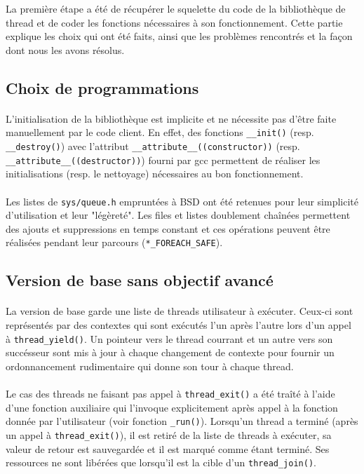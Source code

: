 La première étape a été de récupérer le squelette du code de la bibliothèque de thread et de coder les fonctions nécessaires à son fonctionnement. Cette partie explique les choix qui ont été faits, ainsi que les problèmes rencontrés et la façon dont nous les avons résolus.

\subsection{Choix de programmations}

\paragraph{} L'initialisation de la bibliothèque est implicite et ne nécessite
pas d'être faite manuellement par le code client. En effet, des fonctions
\verb!__init()!  (resp. \verb!__destroy()!) avec l'attribut
\verb!__attribute__((constructor))!  (resp.
\verb!__attribute__((destructor))!) fourni par gcc permettent de réaliser les
initialisations (resp. le nettoyage) nécessaires au bon fonctionnement.

\paragraph{} Les listes de \verb!sys/queue.h! empruntées à BSD ont été
retenues pour leur simplicité d'utilisation et leur "légèreté". Les files et
listes doublement chaînées permettent des ajouts et suppressions en temps
constant et ces opérations peuvent être réalisées pendant leur parcours
(\verb!*_FOREACH_SAFE!).


\subsection{Version de base sans objectif avancé}

\paragraph{} La version de base garde une liste de threads utilisateur à exécuter. Ceux-ci sont représentés par des contextes qui sont exécutés l'un après l'autre lors d'un appel à \verb!thread_yield()!. Un pointeur vers le thread courrant et un autre vers son succésseur sont mis à jour à chaque changement de contexte pour fournir un ordonnancement rudimentaire qui donne son tour à chaque thread.

\paragraph{} Le cas des threads ne faisant pas appel à \verb!thread_exit()! a été traîté à l'aide d'une fonction auxiliaire qui l'invoque explicitement après appel à la fonction donnée par l'utilisateur (voir fonction \verb!_run()!). Lorsqu'un thread a terminé (après un appel à \verb!thread_exit()!), il est retiré de la liste de threads à exécuter, sa valeur de retour est sauvegardée et il est marqué comme étant terminé. Ses ressources ne sont libérées que lorsqu'il est la cible d'un \verb!thread_join()!.
